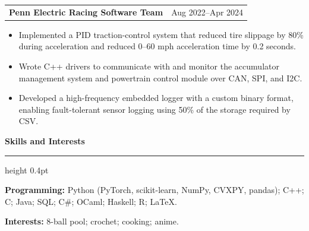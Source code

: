 \documentclass[10pt,letterpaper]{article}
\makeatletter
\newcommand{\cvsection}[1]{%
  \par\addpenalty{-300}\addvspace{12pt}%
  {\large\bfseries #1\par}%
  \nobreak\vspace{3pt}\hrule height 0.4pt%
  \nobreak\vspace{6pt}\nobreak
}
\newcommand{\entrysep}{\par\addvspace{6pt}}
\newcommand{\entry}[2]{\noindent\begin{tabularx}{\textwidth}{@{}Xr@{}}#1 & #2\end{tabularx}\par\nobreak\vspace{2pt}}
\makeatother
\begin{document}
\begin{samepage}
\entry{\textbf{Penn Electric Racing Software Team}}{Aug 2022--Apr 2024}
\begin{itemize}
\item Implemented a PID traction-control system that reduced tire slippage by 80\% during acceleration and reduced 0--60 mph acceleration time by 0.2 seconds.
\item Wrote C++ drivers to communicate with and monitor the accumulator management system and powertrain control module over CAN, SPI, and I2C.
\item Developed a high-frequency embedded logger with a custom binary format, enabling fault-tolerant sensor logging using 50\% of the storage required by CSV.
\end{itemize}
\end{samepage}\entrysep
\cvsection{Skills and Interests}
\begin{samepage}
\textbf{Programming:} Python (PyTorch, scikit-learn, NumPy, CVXPY, pandas); C++; C; Java; SQL; C\#; OCaml; Haskell; R; LaTeX.\par
\end{samepage}\entrysep
\begin{samepage}
\textbf{Interests:} 8-ball pool; crochet; cooking; anime.\par
\end{samepage}\entrysep
\end{document}
